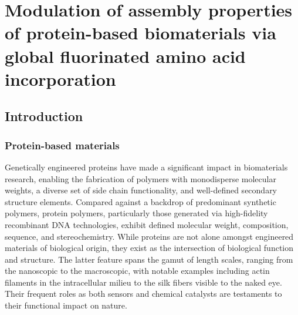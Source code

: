 \chapter{Modulation of assembly properties of protein-based biomaterials via
global fluorinated amino acid incorporation}

\begin{refsection}

\section{Introduction}

\subsection{Protein-based materials}


Genetically engineered proteins have made a significant impact in biomaterials
research, enabling the fabrication of polymers with monodisperse molecular
weights, a diverse set of side chain functionality, and well-defined secondary
structure elements.\cite{
Yoshikawa1994,Wang2001,Rabotyagova2009,Martin2009,Dinerman2002,Megeed2002,Haider2004,Wright2002,Banta2010,Link2003,Straley2009,Rabotyagova2011}
Compared against a backdrop of predominant synthetic polymers, protein polymers,
particularly those generated via high-fidelity recombinant DNA technologies,
exhibit defined molecular weight, composition, sequence, and
stereochemistry.\cite{} While proteins are not alone amongst engineered
materials of biological origin, they exist as the intersection of biological
function and structure. The latter feature spans the gamut of length scales,
ranging from the nanoscopic to the macroscopic, with notable examples including
actin filaments in the intracellular milieu to the silk fibers visible to the
naked eye.\cite{Rabotyagova2009} Their frequent roles as both sensors and
chemical catalysts are testaments to their functional impact on nature.



\end{refsection}
